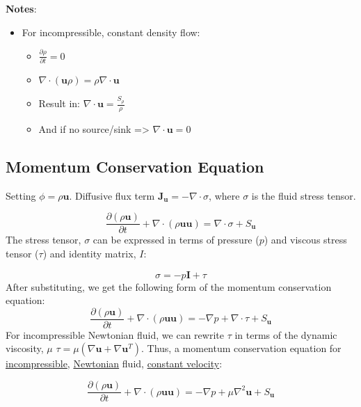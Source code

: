 \documentclass[11pt]{article}
\begin{document}
\textbf{Notes}:
\begin{itemize}
\item For incompressible, constant density flow:
\begin{itemize}
\item \(\frac{\partial \rho}{\partial t} = 0\)
\item \(\nabla \cdot (\textbf{u}\rho) = \rho \nabla \cdot \textbf{u}\)
\item Result in: \(\nabla \cdot \textbf{u} = \frac{S_\rho}{\rho}\)
\item And if no source/sink => \(\nabla \cdot \textbf{u} = 0\)
\end{itemize}
\end{itemize}

\subsection{Momentum Conservation Equation}
\label{sec:orgbe79d89}
Setting \(\phi = \rho \textbf{u}\). Diffusive flux term \(\textbf{J}_\textbf{u} = -\nabla \cdot \sigma\), where
\(\sigma\) is the fluid stress tensor. 

\begin{equation}
\frac{\partial (\rho \textbf{u})}{\partial t} + \nabla \cdot (\rho \textbf{uu})  = \nabla \cdot \sigma +
S_\textbf{u}
\end{equation}
The stress tensor, \(\sigma\) can be expressed in terms of pressure (\(p\)) and viscous stress tensor (\(\tau\))
and identity matrix, \(I\):

\begin{equation}
\sigma = -p\textbf{I} + \tau
\end{equation}
After substituting, we get the following form of the momentum conservation equation:
\begin{equation}
\frac{\partial (\rho \textbf{u})}{\partial t} + \nabla \cdot (\rho \textbf{uu})  = -\nabla p + \nabla \cdot \tau
+ S_\textbf{u}
\end{equation}
For incompressible Newtonian fluid, we can rewrite \(\tau\) in terms of the dynamic viscosity, \(\mu\)
\(\tau = \mu(\nabla \textbf{u}+\nabla \textbf{u}^T)\).  Thus, a momentum conservation equation for \uline{incompressible},
\uline{Newtonian} fluid, \uline{constant velocity}:

\begin{equation}
\frac{\partial (\rho \textbf{u})}{\partial t} + \nabla \cdot (\rho \textbf{uu})  = -\nabla p + \mu \nabla^2
\textbf{u} + S_\textbf{u}
\end{equation}
\end{document}
